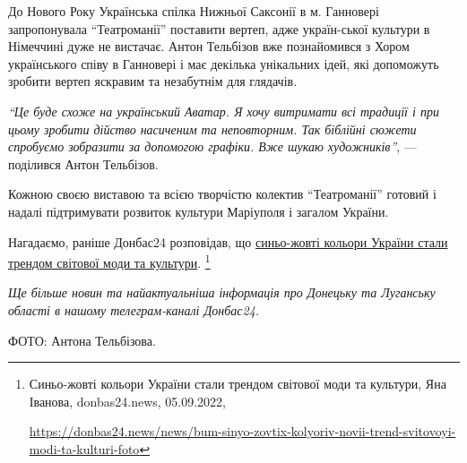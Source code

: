 До Нового Року Українська спілка Нижньої Саксонії в м. Ганновері запропонувала
\enquote{Театроманії} поставити вертеп, адже україн\hyp{}ської культури в Німеччині дуже не
вистачає. Антон Тельбізов вже познайомився з Хором українського співу в
Ганновері і має декілька унікальних ідей, які допоможуть зробити вертеп
яскравим та незабутнім для глядачів.

\begin{leftbar}
  \begingroup
\emph{\enquote{Це буде схоже на український Аватар. Я хочу витримати всі традиції і при цьому
зробити дійство насиченим та неповторним. Так біблійні сюжети спробуємо
зобразити за допомогою графіки. Вже шукаю художників}}, — поділився
Антон Тельбізов. 
   \endgroup
\end{leftbar}

Кожною своєю виставою та всією творчістю колектив \enquote{Театроманії} готовий і
надалі підтримувати розвиток культури Маріуполя і загалом України.


Нагадаємо, раніше Донбас24 розповідав, що \href{https://donbas24.news/news/bum-sinyo-zovtix-kolyoriv-novii-trend-svitovoyi-modi-ta-kulturi-foto}{синьо-жовті кольори України стали
трендом світової моди та культури}.%
\footnote{Синьо-жовті кольори України стали трендом світової моди та культури, Яна Іванова, donbas24.news, %
05.09.2022, \par\url{https://donbas24.news/news/bum-sinyo-zovtix-kolyoriv-novii-trend-svitovoyi-modi-ta-kulturi-foto}
}

\emph{Ще більше новин та найактуальніша інформація про Донецьку та Луганську області
в нашому телеграм-каналі Донбас24.}

ФОТО: Антона Тельбізова.

